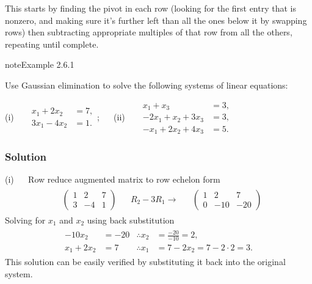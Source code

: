\documentclass[letterpaper,10pt,english]{jupyterBook}
\begin{document}
\sphinxAtStartPar
This starts by finding the pivot in each row (looking for the first entry that is non\sphinxhyphen{}zero, and making sure it’s further left than all the ones below it by swapping rows) then subtracting appropriate multiples of that row from all the others, repeating until complete.


\label{_pages/2.3_Gaussian_elimination:ge-example}
\begin{sphinxadmonition}{note}{Example 2.6.1}



\sphinxAtStartPar
Use Gaussian elimination to solve the following systems of linear equations:

\sphinxAtStartPar
(i)   \( \begin{align*}
    x_1 + 2x_2 &= 7, \\
    3x_1 - 4x_2 &= 1.
    \end{align*} \);  
(ii)   \(\begin{align*}
    x_1 + x_3 &= 3, \\
    -2x_1 + x_2 + 3x_3 &= 3, \\
    -x_1 + 2x_2 + 4x_3 &= 5.
\end{align*}\)
\subsubsection*{Solution}

\sphinxAtStartPar
(i)   Row reduce augmented matrix to row echelon form
\begin{equation*}
\begin{split} \begin{align*}
    & \left( \begin{array}{cc|c} 1 & 2 & 7 \\ 3 & -4 & 1 \end{array} \right)
    \begin{array}{l} \\ \end{array} &
    R_2 - 3R_1 \longrightarrow &
    & \left( \begin{array}{cc|c} 1 & 2 & 7 \\ 0 & -10 & -20 \end{array} \right)
\end{align*} \end{split}
\end{equation*}
\sphinxAtStartPar
Solving for \(x_1\) and \(x_2\) using back substitution
\begin{equation*}
\begin{split} \begin{align*}
    -10x_2 &= -20 & \therefore x_2 &= \frac{-20}{-10} = 2, \\
    x_1 + 2x_2 &= 7 & \therefore x_1 &= 7 - 2x_2 = 7 - 2 \cdot 2 = 3.
\end{align*} \end{split}
\end{equation*}
\sphinxAtStartPar
This solution can be easily verified by substituting it back into the original system.


\end{sphinxadmonition}
\end{document}
